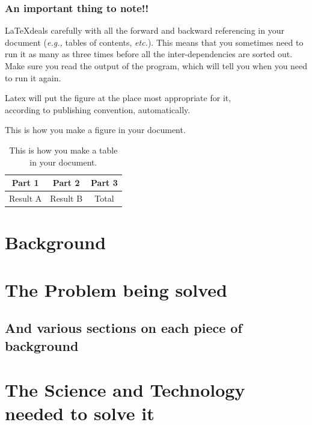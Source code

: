 \documentclass{beamer} %
\begin{document}
\begin{frame}
\frametitle{An important thing to note!!}

\LaTeX deals carefully with all the forward and backward referencing in your document ({\it e.g.,} tables of contents, {\it etc.}). This means that you sometimes need to run it as many as three times before all the inter-dependencies are sorted out. Make sure you read the output of the program, which will tell you when you need to run it again.
\end{frame}

\begin{frame}
\begin{center}
\vspace{.5in}

Latex will put the figure at the place most appropriate for it, \\according to publishing convention, automatically.
\end{center}
{This is how you make a figure in your document.}
\end{frame}

\begin{frame}

\begin{table}
\begin{center}
\begin{tabular}{|cc|c|}
\hline
Part 1 & Part 2 & Part 3\\\hline
Result A & Result B & Total \\\hline
\end{tabular}
\end{center}
\caption{This is how you make a table in your document.}
\end{table}
\end{frame}

\section{Background}
\section{The Problem being solved}
\subsection{And various sections on each piece of background}
\section{The Science and Technology needed to solve it}
\end{document}
